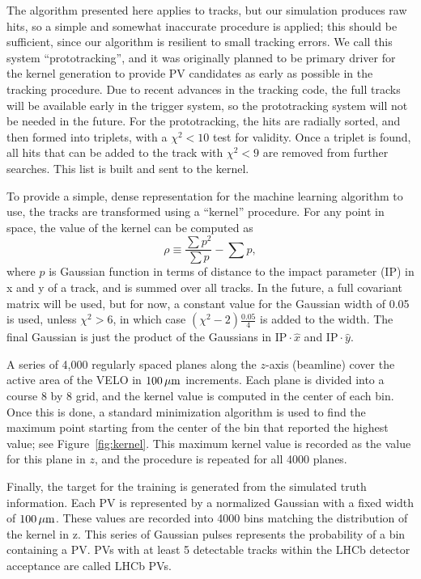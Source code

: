 \documentclass[10pt, paper=a4, UKenglish]{article}
\begin{document}
The algorithm presented here applies to tracks, but our simulation produces raw hits, so a simple and somewhat inaccurate procedure is applied; this should be sufficient, since our algorithm is resilient to small tracking errors. We call this system ``prototracking'', and it was originally planned to be primary driver for the kernel generation to provide PV candidates as early as possible in the tracking procedure. Due to recent advances in the tracking code, the full tracks will be available early in the trigger system, so the prototracking system will not be needed in the future. For the prototracking, the hits are radially sorted, and then formed into triplets, with a $\chi^2 < 10$ test for validity. Once a triplet is found, all hits that can be added to the track with $\chi^2<9$ are removed from further searches. This list is built and sent to the kernel.

To provide a simple, dense representation for the machine learning algorithm to use, the tracks are transformed using a ``kernel'' procedure. For any point in space, the value of the kernel can be computed as 
%
\begin{equation}
\rho \equiv  \frac{ \sum  p^2}{\sum  p} - \sum p,
\end{equation}
%
where $p$ is Gaussian function in terms of distance to the impact parameter (IP) in x and y of a track, and is summed over all tracks.
In the future, a full covariant matrix will be used, but for now, a constant value for the Gaussian width of 0.05 is used, unless $\chi^2>6$, in which case $ (\chi^2-2)\frac{0.05}{4} $ is added to the width.
The final Gaussian is just the product of the Gaussians in $ \mathrm{IP} \cdot \hat{x}$ and $ \mathrm{IP} \cdot \hat{y}$.

A series of 4,000 regularly spaced planes along the $z$-axis (beamline) cover the active area of the VELO in $\unit[100]{\mu m}$ increments. Each plane is divided into a course 8 by 8 grid, and the kernel value is computed in the center of each bin. Once this is done, a standard minimization algorithm is used to find the maximum point starting from the center of the bin that reported the highest value; see Figure~\ref{fig:kernel}. This maximum kernel value is recorded as the value for this plane in $z$, and the procedure is repeated for all 4000 planes.

Finally, the target for the training is generated from the simulated truth information. Each PV is represented by a normalized Gaussian with a fixed width of $\unit[100]{\mu m}$. These values are recorded into 4000 bins matching the distribution of the kernel in z. This series of Gaussian pulses represents the probability of a bin containing a PV.  %
PVs with at least 5 detectable tracks within the LHCb detector acceptance are called LHCb PVs.
\end{document}
